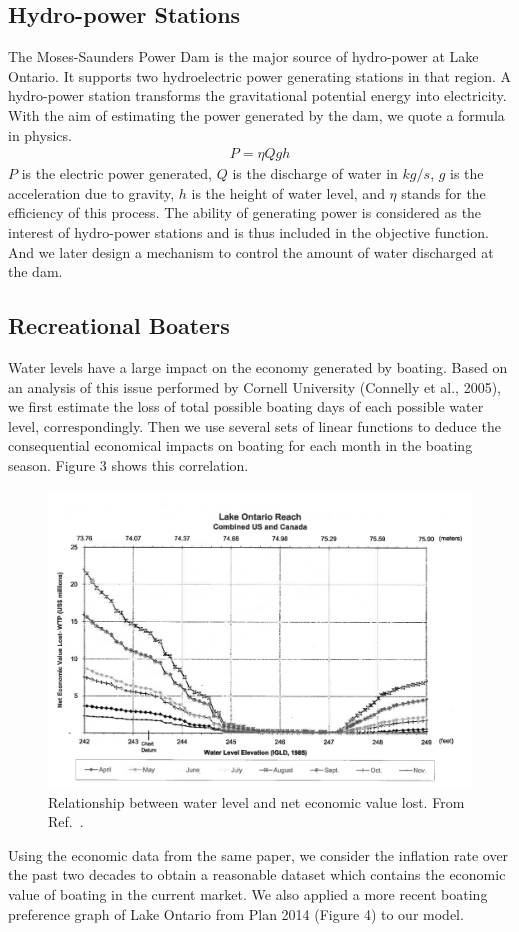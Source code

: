 \documentclass[pre,12pt]{revtex4-1}
\begin{document}
\subsection{Hydro-power Stations}
The Moses-Saunders Power Dam is the major source of hydro-power at Lake Ontario. It supports two hydroelectric power generating stations in that region. A hydro-power station transforms the gravitational potential energy into electricity. With the aim of estimating the power generated by the dam, we quote a formula in physics. 
\begin{align}
    P = \eta Qgh
\end{align}
$P$ is the electric power generated, $Q$ is the discharge of water in $kg/s$, $g$ is the acceleration due to gravity, $h$ is the height of water level, and $\eta$ stands for the efficiency of this process. The ability of generating power is considered as the interest of hydro-power stations and is thus included in the objective function. And we later design a mechanism to control the amount of water discharged at the dam.

\subsection{Recreational Boaters}
Water levels have a large impact on the economy generated by boating. Based on an analysis of this issue performed by Cornell University (Connelly et al., 2005), we first estimate the loss of total possible boating days of each possible water level, correspondingly. Then we use several sets of linear functions to deduce the consequential economical impacts on boating for each month in the boating season. Figure 3 shows this correlation. \par
\begin{figure}[htbp]
\begin{center}
\includegraphics[width=4.5in]{boating.png}
\caption{Relationship between water level and net economic value lost.  From Ref.~\cite{nd05}.}
\label{leaf}
\end{center}
\end{figure}
Using the economic data from the same paper, we consider the inflation rate over the past two decades to obtain a reasonable dataset which contains the economic value of boating in the current market. We also applied a more recent boating preference graph of Lake Ontario from Plan 2014 (Figure 4) to our model. 
\end{document}
